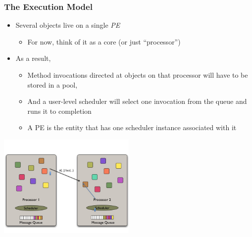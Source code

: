 \begin{frame}[t]
\frametitle{The Execution Model}
  \begin{itemize}
    \item Several objects live on a single {\em PE} 
      \begin{itemize}
        \item For now, think of it as a core (or just ``processor'')
      \end{itemize}
  \pause
  \item As a result, 
    \begin{itemize}
      \item Method invocations directed at objects on that processor will have to be stored in a pool,
      \pause
      \item And a user-level scheduler will select one invocation from the queue and runs it to completion
      \item A PE is the entity that has one scheduler instance
           associated with it
    \end{itemize}
  \end{itemize}
  \begin{center} \includegraphics[width=0.5\textwidth]{figures/schedulerInvocation} \end{center}
\end{frame}

